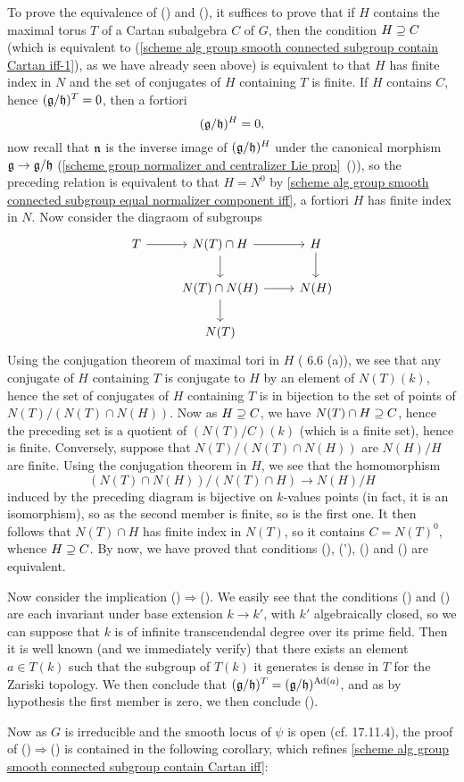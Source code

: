 To prove the equivalence of () and (), it suffices to prove that if $H$ contains the maximal torus $T$ of a Cartan subalgebra $C$ of $G$, then the condition $H\supseteq C$ (which is equivalent to (\ref{scheme alg group smooth connected subgroup contain Cartan iff-1}), as we have already seen above) is equivalent to that $H$ has finite index in $N$ and the set of conjugates of $H$ containing $T$ is finite. If $H$ contains $C$, hence $(\mathfrak{g}/\mathfrak{h})^T=0$, then a fortiori
\begin{equation}\label{scheme alg group smooth connected subgroup contain Cartan iff-2}
(\mathfrak{g}/\mathfrak{h})^H=0,
\end{equation}
now recall that $\mathfrak{n}$ is the inverse image of $(\mathfrak{g}/\mathfrak{h})^H$ under the canonical morphism $\mathfrak{g}\to\mathfrak{g}/\mathfrak{h}$ (\cref{scheme group normalizer and centralizer Lie prop}~()), so the preceding relation is equivalent to that $H=N^0$ by \cref{scheme alg group smooth connected subgroup equal normalizer component iff}, a fortiori $H$ has finite index in $N$. Now consider the diagraom of subgroups
\[\begin{tikzcd}
T\ar[r]&N(T)\cap H\ar[r]\ar[d]&H\ar[d]\\
&N(T)\cap N(H)\ar[d]\ar[r]&N(H)\\
&N(T)
\end{tikzcd}\]
Using the conjugation theorem of maximal tori in $H$ (\cite{SGA3-2} 6.6 (a)), we see that any conjugate of $H$ containing $T$ is conjugate to $H$ by an element of $N(T)(k)$, hence the set of conjugates of $H$ containing $T$ is in bijection to the set of points of $N(T)/(N(T)\cap N(H))$. Now as $H\supseteq C$, we have $N(T)\cap H\supseteq C$, hence the preceding set is a quotient of $(N(T)/C)(k)$ (which is a finite set), hence is finite. Conversely, suppose that $N(T)/(N(T)\cap N(H))$ are $N(H)/H$ are finite. Using the conjugation theorem in $H$, we see that the homomorphism
\[(N(T)\cap N(H))/(N(T)\cap H)\to N(H)/H\]
induced by the preceding diagram is bijective on $k$-values points (in fact, it is an isomorphism), so as the second member is finite, so is the first one. It then follows that $N(T)\cap H$ has finite index in $N(T)$, so it contains $C=N(T)^0$, whence $H\supseteq C$. By now, we have proved that conditions (), ('), () and () are equivalent.\par
Now consider the implication ()$\Rightarrow$(). We easily see that the conditions () and () are each invariant under base extension $k\to k'$, with $k'$ algebraically closed, so we can suppose that $k$ is of infinite transcendendal degree over its prime field. Then it is well known (and we immediately verify) that there exists an element $a\in T(k)$ such that the subgroup of $T(k)$ it generates is dense in $T$ for the Zariski topology. We then conclude that $(\mathfrak{g}/\mathfrak{h})^T=(\mathfrak{g}/\mathfrak{h})^{\mathrm{Ad}(a)}$, and as by hypothesis the first member is zero, we then conclude ().\par
Now as $G$ is irreducible and the smooth locus of $\psi$ is open (cf. \cite{EGA4-4} 17.11.4), the proof of ()$\Rightarrow$() is contained in the following corollary, which refines \cref{scheme alg group smooth connected subgroup contain Cartan iff}:

